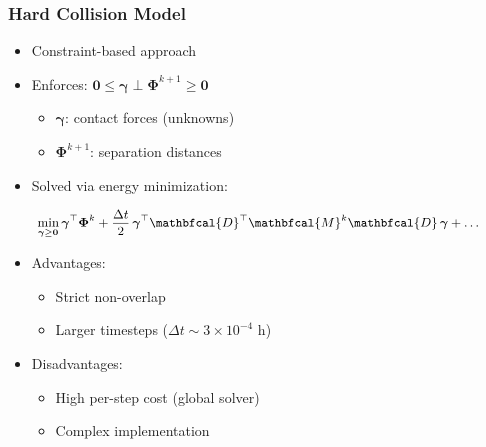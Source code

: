 \documentclass[
	10pt,
	t
]{beamer}
\newcommand{\xmark}{\ding{55}}%
\newcommand{\cmark}{\ding{51}}%
\begin{document}
\begin{frame}
    \frametitle{Hard Collision Model}

    \begin{itemize}
        \item Constraint-based approach
        \item Enforces: $\mathbf{0} \leq \boldsymbol{\gamma} \perp \mathbf{\Phi}^{k+1} \geq \mathbf{0}$
              \begin{itemize}
                  \item $\boldsymbol{\gamma}$: contact forces (unknowns)
                  \item $\mathbf{\Phi}^{k+1}$: separation distances
              \end{itemize}
        \item Solved via energy minimization:
    \end{itemize}

    \begin{equation*}
        \small
        \min_{\boldsymbol{\gamma} \geq \mathbf{0}} \boldsymbol{\gamma}^\top \mathbf{\Phi}^k + \frac{\Delta t}{2}\, \boldsymbol{\gamma}^\top \mathbfcal{D}^\top \mathbfcal{M}^k \mathbfcal{D}\, \boldsymbol{\gamma} + \dots
    \end{equation*}

    \begin{itemize}
        \item Advantages:
              \begin{itemize}
                  \item \cmark \; Strict non-overlap
                  \item \cmark \; Larger timesteps ($\Delta t \sim 3 \times 10^{-4}$ h)
              \end{itemize}
        \item Disadvantages:
              \begin{itemize}
                  \item \xmark \; High per-step cost (global solver)
                  \item \xmark \; Complex implementation
              \end{itemize}
    \end{itemize}

\end{frame}
\end{document}
